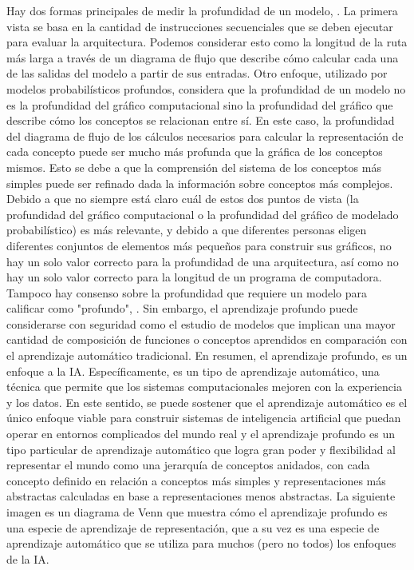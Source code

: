 	\vskip 0.4cm 
	Hay dos formas principales de medir la profundidad de un modelo, \citep{Goodfellow-et-al-2016}. La primera vista se basa en la cantidad de instrucciones secuenciales que se deben ejecutar para evaluar la arquitectura. Podemos considerar esto como la longitud de la ruta más larga a través de un diagrama de flujo que describe cómo calcular cada una de las salidas del modelo a partir de sus entradas. Otro enfoque, utilizado por modelos probabilísticos profundos, considera que la profundidad de un modelo no es la profundidad del gráfico computacional sino la profundidad del gráfico que describe cómo los conceptos se relacionan entre sí. En este caso, la profundidad del diagrama de flujo de los cálculos necesarios para calcular la representación de cada concepto puede ser mucho más profunda que la gráfica de los conceptos mismos. Esto se debe a que la comprensión del sistema de los conceptos más simples puede ser refinado dada la información sobre conceptos más complejos.
	\vskip 0.4cm 
	Debido a que no siempre está claro cuál de estos dos puntos de vista (la profundidad del gráfico computacional o la profundidad del gráfico de modelado probabilístico) es más relevante, y debido a que diferentes personas eligen diferentes conjuntos de elementos más pequeños para construir sus gráficos, no hay un solo valor correcto para la profundidad de una arquitectura, así como no hay un solo valor correcto para la longitud de un programa de computadora. Tampoco hay consenso sobre la profundidad que requiere un modelo para calificar como "profundo", \citep{Goodfellow-et-al-2016}. Sin embargo, el aprendizaje profundo puede considerarse con seguridad como el estudio de modelos que implican una mayor cantidad de composición de funciones o conceptos aprendidos en comparación con el aprendizaje automático tradicional.
	\vskip 0.4cm 
	En resumen, el aprendizaje profundo, es un enfoque a la IA. Específicamente, es un tipo de aprendizaje automático, una técnica que permite que los sistemas computacionales mejoren con la experiencia y los datos. En este sentido, se puede sostener que el aprendizaje automático es el único enfoque viable para construir sistemas de inteligencia artificial que puedan operar en entornos complicados del mundo real y el aprendizaje profundo es un tipo particular de aprendizaje automático que logra gran poder y flexibilidad al representar el mundo como una jerarquía de conceptos anidados, con cada concepto definido en relación a conceptos más simples y representaciones más abstractas calculadas en base a representaciones menos abstractas. La siguiente imagen es un diagrama de Venn que muestra cómo el aprendizaje profundo es una especie de aprendizaje de representación, que a su vez es una especie de aprendizaje automático que se utiliza para muchos (pero no todos) los enfoques de la IA. 

